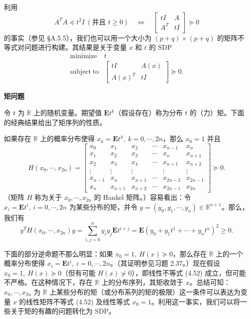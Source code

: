 \documentclass[UTF8, 12pt, fontset=fandol, oneside]{ctexart}
\begin{document}
利用
\[
A^TA\preceq t^2I\ (\text{并且 }t\geq 0)\quad\Longleftrightarrow\quad
\begin{bmatrix}
tI & A\\
A^T & tI
\end{bmatrix}\succeq 0
\]
的事实（参见 \S A.5.5），我们也可以用一个大小为 $(p+q)\times(p+q)$ 的矩阵不等式对问题进行构建。其结果是关于变量 $x$ 和 $t$ 的 SDP
\[
\begin{array}{ll}
\mathop{\mathrm{minimize}} & t\\
\mathrm{subject\ to} &
\begin{bmatrix}
tI & A(x)\\
A(x)^T & tI
\end{bmatrix}\succeq 0.
\end{array}
\]

\noindent\textbf{矩问题}

令 $t$ 为 $\mathbb{R}$ 上的随机变量。期望值 $\mathbf{E}t^k$（假设存在）称为分布 $t$ 的（力）矩。下面的经典结果给出了矩序列的性质。

如果存在 $\mathbb{R}$ 上的概率分布使得 $x_k=\mathbf{E}t^k,\ k=0,\cdots,2n$，那么 $x_0=1$ 并且
\begin{equation}
H(x_0,\cdots,x_{2n})=
\begin{bmatrix}
x_0 & x_1 & x_2 & \cdots & x_{n-1} & x_n\\
x_1 & x_2 & x_3 & \cdots & x_n & x_{n+1}\\
x_2 & x_3 & x_4 & \cdots & x_{n+1} & x_{n+2}\\
\vdots & \vdots & \vdots & & \vdots & \vdots\\
x_{n-1} & x_n & x_{n+1} & \cdots & x_{2n-2} & x_{2n-1}\\
x_n & x_{n+1} & x_{n+2} & \cdots & x_{2n-1} & x_{2n}
\end{bmatrix}\succeq 0.
\tag{4.52}
\end{equation}
（矩阵 $H$ 称为关于 $x_0,\cdots,x_{2n}$ 的 Hankel 矩阵。）容易看出：令 $x_i=\mathbf{E}t^i,\ i=0,\cdots,2n$ 为某些分布的矩，并令 $y=(y_0,y_1,\cdots,y_n)\in\mathbb{R}^{n+1}$。那么，我们有
\[
y^TH(x_0,\cdots,x_{2n})y=\sum_{i,j=0}^n y_iy_j\mathbf{E}t^{i+j}
=\mathbf{E}(y_0+y_1t^1+\cdots+y_nt^n)^2\geq 0.
\]

下面的部分逆命题不那么明显：如果 $x_0=1,\ H(x)\succeq 0$，那么存在 $\mathbb{R}$ 上的一个概率分布使得 $x_i=\mathbf{E}t^i,\ i=0,\cdots,2n$。（其证明参见习题 2.37。）现在假设 $x_0=1,\ H(x)\succeq 0$（但有可能 $H(x)\not\succ 0$），即线性不等式 (4.52) 成立，但可能不严格。在这种情况下，存在 $\mathbb{R}$ 上的分布序列，其矩收敛于 $x$。总结可知：$x_0,\cdots,x_{2n}$ 为 $\mathbb{R}$ 上某些分布的矩（或分布系列的矩的极限）这一条件可以表达为变量 $x$ 的线性矩阵不等式 (4.52) 及线性等式 $x_0=1$。利用这一事实，我们可以将一些关于矩的有趣的问题转化为 SDP。
\end{document}
